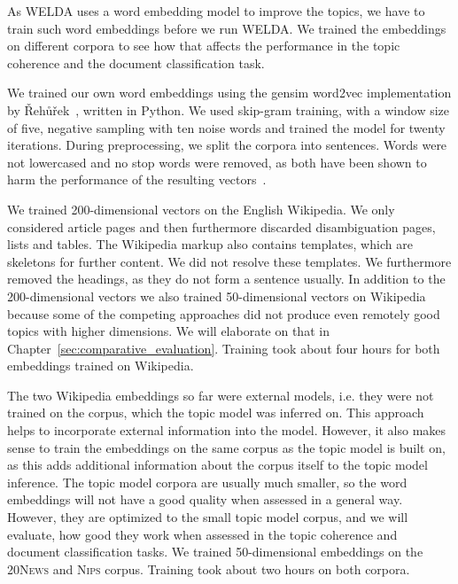 \documentclass[
        a4paper,
        titlepage,
        twoside,
        parskip,
        numbers=noenddot
        ]{scrbook}
\theoremstyle{break}
\begin{document}
As WELDA uses a word embedding model to improve the topics, we have to train such word embeddings before we run WELDA.
We trained the embeddings on different corpora to see how that affects the performance in the topic coherence and the document classification task.

We trained our own word embeddings using the gensim word2vec implementation by {\v R}eh{\r u}{\v r}ek~\cite{Rehurek2010}, written in Python.
We used skip-gram training, with a window size of five, negative sampling with ten noise words and trained the model for twenty iterations.
During preprocessing, we split the corpora into sentences.
Words were not lowercased and no stop words were removed, as both have been shown to harm the performance of the resulting vectors~\cite{Mikolov2013d}.

We trained 200-dimensional vectors on the English Wikipedia.
We only considered article pages and then furthermore discarded disambiguation pages, lists and tables.
The Wikipedia markup also contains templates, which are skeletons for further content.
We did not resolve these templates.
We furthermore removed the headings, as they do not form a sentence usually.
In addition to the 200-dimensional vectors we also trained 50-dimensional vectors on Wikipedia because some of the competing approaches did not produce even remotely good topics with higher dimensions.
We will elaborate on that in Chapter~\ref{sec:comparative_evaluation}.
Training took about four hours for both embeddings trained on Wikipedia.

The two Wikipedia embeddings so far were external models, i.e. they were not trained on the corpus, which the topic model was inferred on.
This approach helps to incorporate external information into the model.
However, it also makes sense to train the embeddings on the same corpus as the topic model is built on, as this adds additional information about the corpus itself to the topic model inference.
The topic model corpora are usually much smaller, so the word embeddings will not have a good quality when assessed in a general way.
However, they are optimized to the small topic model corpus, and we will evaluate, how good they work when assessed in the topic coherence and document classification tasks.
We trained 50-dimensional embeddings on the \textsc{20News} and \textsc{Nips} corpus.
Training took about two hours on both corpora.
\end{document}
